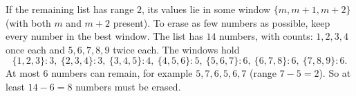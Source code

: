 If the remaining list has range $2$, its values lie in some window $\{m,m+1,m+2\}$ (with both $m$ and $m+2$ present). To erase as few numbers as possible, keep every number in the best window. The list has $14$ numbers, with counts: $1,2,3,4$ once each and $5,6,7,8,9$ twice each. The windows hold
\[
\{1,2,3\}:3,\ \{2,3,4\}:3,\ \{3,4,5\}:4,\ \{4,5,6\}:5,\ \{5,6,7\}:6,\ \{6,7,8\}:6,\ \{7,8,9\}:6 .
\]
At most $6$ numbers can remain, for example $5,7,6,5,6,7$ (range $7-5=2$). So at least $14-6=\boxed{8}$ numbers must be erased.
